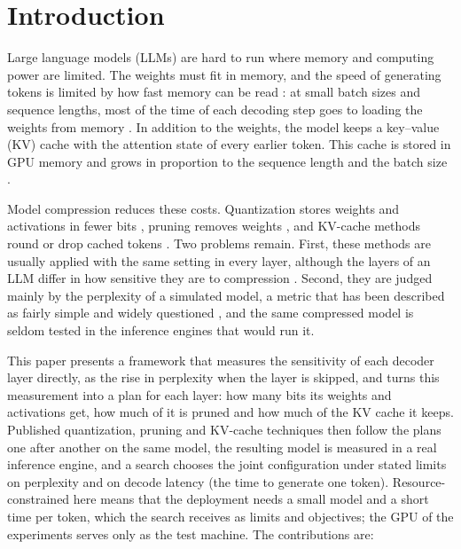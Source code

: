 \documentclass[num-refs]{wiley-article}
\begin{document}
\section{Introduction}

Large language models (LLMs) are hard to run where memory and computing power are limited. The weights must fit in memory, and the speed of generating tokens is limited by how fast memory can be read \cite{lin2024awq}: at small batch sizes and sequence lengths, most of the time of each decoding step goes to loading the weights from memory \cite{pope2023efficiently}. In addition to the weights, the model keeps a key--value (KV) cache with the attention state of every earlier token. This cache is stored in GPU memory and grows in proportion to the sequence length and the batch size \cite{zhang2023h2o}.

Model compression reduces these costs. Quantization stores weights and activations in fewer bits \cite{frantar2023gptq,lin2024awq}, pruning removes weights \cite{sun2024wanda}, and KV-cache methods round or drop cached tokens \cite{zhang2023h2o,hooper2024kvquant}. Two problems remain. First, these methods are usually applied with the same setting in every layer, although the layers of an LLM differ in how sensitive they are to compression \cite{yuan2025asvd}. Second, they are judged mainly by the perplexity of a simulated model, a metric that has been described as fairly simple and widely questioned \cite{jaiswal2024compressing}, and the same compressed model is seldom tested in the inference engines that would run it.

This paper presents a framework that measures the sensitivity of each decoder layer directly, as the rise in perplexity when the layer is skipped, and turns this measurement into a plan for each layer: how many bits its weights and activations get, how much of it is pruned and how much of the KV cache it keeps. Published quantization, pruning and KV-cache techniques then follow the plans one after another on the same model, the resulting model is measured in a real inference engine, and a search chooses the joint configuration under stated limits on perplexity and on decode latency (the time to generate one token). Resource-constrained here means that the deployment needs a small model and a short time per token, which the search receives as limits and objectives; the GPU of the experiments serves only as the test machine. The contributions are:
\end{document}
